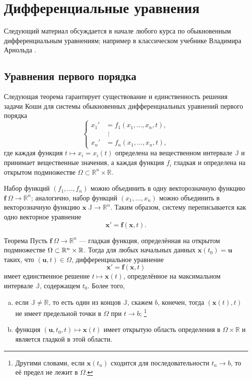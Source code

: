 \section{Дифференциальные уравнения}

{\sloppy

Следующий материал обсуждается в начале любого курса по обыкновенным дифференциальным уравнениям;
например в классическом учебнике Владимира Арнольда \cite{arnold}.

}

\subsection*{Уравнения первого порядка}

Следующая теорема гарантирует существование и единственность решения задачи Коши для системы обыкновенных дифференциальных уравнений первого порядка
\[
\begin{cases}
x_1'&=f_1(x_1,\dots,x_n,t),
\\
&\,\,\vdots
\\
x_n'&=f_n(x_1,\dots,x_n,t),
\end{cases}
\]
где каждая функция $t\mapsto x_i=x_i(t)$ определена на вещественном интервале $\mathbb{J}$ и принимает вещественные значения, а каждая функция $f_i$ гладкая и определена на открытом подмножестве $\Omega\subset \mathbb{R}^n\times \mathbb{R}$.

Набор функций $(f_1,\dots,f_n)$ можно объединить в одну векторозначную функцию $\bm{f}\:\Omega\to \mathbb{R}^n$; аналогично, набор функций $(x_1,\dots,x_n)$ можно объединить в векторозначную функцию $\bm{x}\:\mathbb{J}\to\mathbb{R}^n$.
Таким образом, систему переписывается как одно векторное уравнение
\[\bm{x}'=\bm{f}(\bm{x}, t).\]

\begin{thm}{Теорема}\label{thm:ODE}
Пусть $\bm{f}\:\Omega\to \mathbb{R}^n$ --- гладкая функция, определённая на открытом подмножестве $\Omega\z\subset \mathbb{R}^n\times \mathbb{R}$.
Тогда для любых начальных данных $\bm{x}(t_0)=\bm{u}$ таких, что $(\bm{u},t)\in\Omega$, дифференциальное уравнение
\[\bm{x}'=\bm{f}(\bm{x},t)\]
имеет единственное решение $t\mapsto \bm{x}(t)$, определённое на максимальном интервале $\mathbb{J}$, содержащем $t_0$.
Более того,
\begin{enumerate}[(a)]
\item если $\mathbb{J}\ne \mathbb{R}$, то есть один из концов $\mathbb{J}$, скажем $b$, конечен, тогда $(\bm{x}(t),t)$ не имеет предельной точки в $\Omega$ при $t\to b$;%
\footnote{Другими словами, если $\bm{x}(t_n)$ сходится для последовательности $t_n\to b$, то её предел не лежит в $\Omega$.}

\item функция $(\bm{u},t_0,t)\mapsto \bm{x}(t)$ имеет открытую область определения в $\Omega\times \mathbb{R}$ и является гладкой в этой области.
\end{enumerate}

\end{thm}

